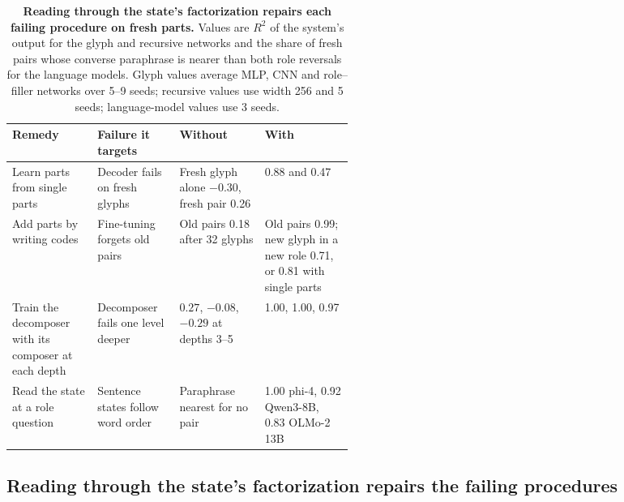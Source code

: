 \documentclass[10pt]{article}
\theoremstyle{plain}
\theoremstyle{remark}
\begin{document}
\begin{table}[b]
  \caption{\textbf{Reading through the state's factorization repairs each failing procedure on fresh parts.} Values are $R^2$ of the system's output for the glyph and recursive networks and the share of fresh pairs whose converse paraphrase is nearer than both role reversals for the language models. Glyph values average MLP, CNN and role--filler networks over 5--9 seeds; recursive values use width 256 and 5 seeds; language-model values use 3 seeds.}
  \label{tab:remedies}
  \centering\small
  \begin{tabularx}{\linewidth}{@{}P{0.25\linewidth}P{0.24\linewidth}YY@{}}
    \toprule
    Remedy & Failure it targets & Without & With \\
    \midrule
    Learn parts from single parts & Decoder fails on fresh glyphs & Fresh glyph alone $-0.30$, fresh pair 0.26 & 0.88 and 0.47 \\
    Add parts by writing codes & Fine-tuning forgets old pairs & Old pairs 0.18 after 32 glyphs & Old pairs 0.99; new glyph in a new role 0.71, or 0.81 with single parts \\
    Train the decomposer with its composer at each depth & Decomposer fails one level deeper & $0.27$, $-0.08$, $-0.29$ at depths 3--5 & 1.00, 1.00, 0.97 \\
    Read the state at a role question & Sentence states follow word order & Paraphrase nearest for no pair & 1.00 phi-4, 0.92 Qwen3-8B, 0.83 OLMo-2 13B \\
    \bottomrule
  \end{tabularx}
\end{table}

\subsection{Reading through the state's factorization repairs the failing procedures}
\label{sec:remedies}
\end{document}
